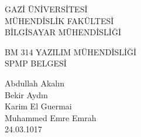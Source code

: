 \begin{titlepage}
   \begin{center}
      \begin{large}
         \vspace*{0.5cm}
         GAZİ ÜNİVERSİTESİ \\
         MÜHENDİSLİK FAKÜLTESİ \\
         BİLGİSAYAR MÜHENDİSLİĞİ

         \vfill
         BM 314 YAZILIM MÜHENDİSLİĞİ \\
         SPMP BELGESİ

         \vfill
         Abdullah Akalın\\Bekir Aydın\\Karim El Guermai\\Muhammed Emre Emrah\\

         \vfill
         \vspace{0.5cm}
         24.03.1017
      \end{large}
   \end{center}
\end{titlepage}
